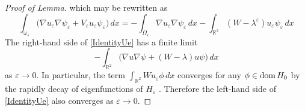 \documentclass[reqno]{amsart}
\theoremstyle{plain}
\numberwithin{equation}{section}
\newcommand{\dom}{\mathop{\rm dom}}
\newcommand{\Real}{\mathbb R}
\newcommand{\eps}{\varepsilon}
\begin{document}
\begin{proof}[Proof of Lemma]
  which may be rewritten as
\begin{equation}\label{IdentityUe}
   \int_{\omega_\eps}\big(\nabla u_\eps \nabla \psi_\eps+
   V_\eps u_\eps \psi_\eps\big)\,dx=
    -\int_{\Omega_\eps}\nabla u_\eps \nabla \psi_\eps\,dx- \int_{\Real^2}
              (W-\lambda^\eps)u_\eps \psi_\eps\,dx
\end{equation}
The right-hand side of \eqref{IdentityUe} has a finite limit
\begin{equation*}
  -\int_{\Real^2}\big(\nabla u \nabla \psi+
              (W-\lambda)u \psi\big)\,dx
\end{equation*}
as $\eps\to 0$. In particular, the term $\int_{\Real^2}Wu_\eps \phi\,dx$ converges  for any  $\phi\in \dom H_0$ by the rapidly decay of  eigenfunctions of $H_\eps$ \cite[Ch.3.3]{BerezinShubinBook}. Therefore the left-hand side of \eqref{IdentityUe} also converges as $\eps\to 0$.



\end{proof}
\end{document}
